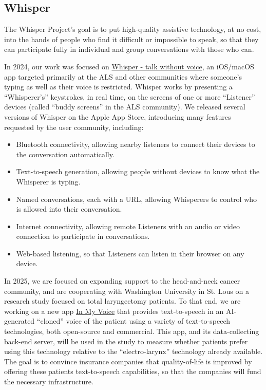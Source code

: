 \documentclass[a4paper]{report}
\begin{document}
\subsection{Whisper}

The Whisper Project’s goal is to put high-quality assistive technology, at no cost, into the hands of people who find it difficult or impossible to speak, so that they can participate fully in individual and group conversations with those who can.

In 2024, our work was focused on \href{https://apps.apple.com/us/app/whisper-talk-without-voice/id6446479064}{Whisper - talk without voice}, an iOS/macOS app targeted primarily at the ALS and other communities where someone’s typing as well as their voice is restricted. Whisper works by presenting a “Whisperer’s” keystrokes, in real time, on the screens of one or more “Listener” devices (called “buddy screens” in the ALS community). We released several versions of Whisper on the Apple App Store, introducing many features requested by the user community, including:

\begin{itemize}

\item Bluetooth connectivity, allowing nearby listeners to connect their devices to the conversation automatically.
\item Text-to-speech generation, allowing people without devices to know what the Whisperer is typing.
\item Named conversations, each with a URL, allowing Whisperers to control who is allowed into their conversation.
\item Internet connectivity, allowing remote Listeners with an audio or video connection to participate in conversations.
\item Web-based listening, so that Listeners can listen in their browser on any device.

\end{itemize}

In 2025, we are focused on expanding support to the head-and-neck cancer community, and are cooperating with Washington University in St. Lous on a research study focused on total laryngectomy patients. To that end, we are working on a new app \href{https://apps.apple.com/us/app/in-my-voice/id6742593911}{In My Voice} that provides text-to-speech in an AI-generated “cloned” voice of the patient using a variety of text-to-speech technologies, both open-source and commercial. This app, and its data-collecting back-end server, will be used in the study to measure whether patients prefer using this technology relative to the “electro-larynx” technology already available. The goal is to convince insurance companies that quality-of-life is improved by offering these patients text-to-speech capabilities, so that the companies will fund the necessary infrastructure.
\end{document}
